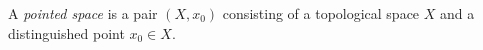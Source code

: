 
A \emph{pointed space} is a pair $(X,x_0)$ consisting of a topological space $X$ and a distinguished point $x_0\in X$.
